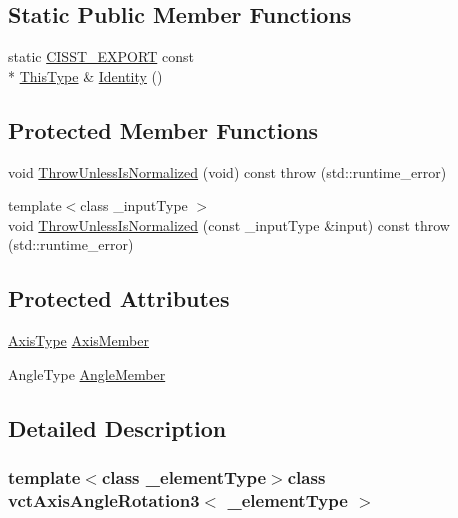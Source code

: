 \subsection*{Static Public Member Functions}
\begin{DoxyCompactItemize}
\item 
static \hyperlink{cmn_export_macros_8h_a99393e0c3ac434b2605235bbe20684f8}{C\-I\-S\-S\-T\-\_\-\-E\-X\-P\-O\-R\-T} const \\*
\hyperlink{classvct_axis_angle_rotation3_af654a8037b7b82a378f69cb1bfd9b8dd}{This\-Type} \& \hyperlink{classvct_axis_angle_rotation3_a66b018a0fc03eb011c286761aa00833b}{Identity} ()
\end{DoxyCompactItemize}
\subsection*{Protected Member Functions}
\begin{DoxyCompactItemize}
\item 
void \hyperlink{classvct_axis_angle_rotation3_a1849694a8937fd494daf2878aee541a2}{Throw\-Unless\-Is\-Normalized} (void) const   throw (std\-::runtime\-\_\-error)
\item 
{\footnotesize template$<$class \-\_\-input\-Type $>$ }\\void \hyperlink{classvct_axis_angle_rotation3_a680d5519113ed0c2687c0352261bb47c}{Throw\-Unless\-Is\-Normalized} (const \-\_\-input\-Type \&input) const   throw (std\-::runtime\-\_\-error)
\end{DoxyCompactItemize}
\subsection*{Protected Attributes}
\begin{DoxyCompactItemize}
\item 
\hyperlink{classvct_axis_angle_rotation3_a3178fd901bb60bb447711b9d5f7e7aae}{Axis\-Type} \hyperlink{classvct_axis_angle_rotation3_ae73a683f2aff0496ec2d15176c357d83}{Axis\-Member}
\item 
Angle\-Type \hyperlink{classvct_axis_angle_rotation3_aa04d755b8de3c1bf343c0c027a1af28f}{Angle\-Member}
\end{DoxyCompactItemize}


\subsection{Detailed Description}
\subsubsection*{template$<$class \-\_\-element\-Type$>$class vct\-Axis\-Angle\-Rotation3$<$ \-\_\-element\-Type $>$}

